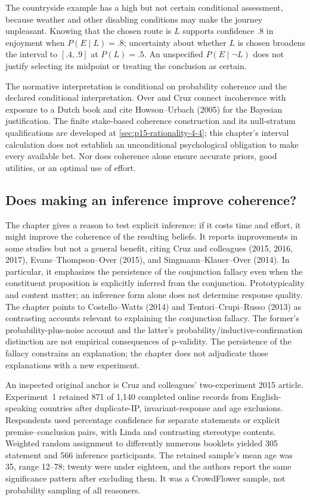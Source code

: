 The countryside example has a high but not certain conditional assessment,
because weather and other disabling conditions may make the journey
unpleasant. Knowing that the chosen route is \(L\) supports confidence
\(.8\) in enjoyment when \(P(E\mid L)=.8\); uncertainty about
whether \(L\) is chosen broadens the interval to \([.4,.9]\) at
\(P(L)=.5\). An unspecified \(P(E\mid\neg L)\) does not justify
selecting its midpoint or treating the conclusion as certain.

The normative interpretation is conditional on probability coherence and
the declared conditional interpretation. Over and Cruz connect incoherence
with exposure to a Dutch book and cite Howson--Urbach (2005) for the Bayesian
justification. The finite stake-based coherence construction and its
null-stratum qualifications are developed at \cref{sec:p15-rationality-4-4};
this chapter's interval calculation does not establish an unconditional
psychological obligation to make every available bet. Nor does coherence
alone ensure accurate priors, good utilities, or an optimal use of effort.

\subsection{Does making an inference improve coherence?}
\label{sec:p19-r62-explicit-inference}

The chapter gives a reason to test explicit inference: if it costs time and
effort, it might improve the coherence of the resulting beliefs. It reports
improvements in some studies but not a general benefit, citing Cruz and
colleagues (2015, 2016, 2017), Evans--Thompson--Over (2015), and
Singmann--Klauer--Over (2014). In particular, it emphasizes the persistence
of the conjunction fallacy even when the constituent proposition is
explicitly inferred from the conjunction. Prototypicality and content
matter; an inference form alone does not determine response quality.
The chapter points to Costello--Watts (2014) and Tentori--Crupi--Russo
(2013) as contrasting accounts relevant to explaining the conjunction
fallacy. The former's probability-plus-noise account and the latter's
probability/inductive-confirmation distinction are not empirical
consequences of p-validity. The persistence of the fallacy constrains
an explanation; the chapter does not adjudicate those explanations
with a new experiment.

An inspected original anchor is Cruz and colleagues' two-experiment
2015 article. Experiment~1 retained 871 of 1,140 completed online records
from English-speaking countries after duplicate-IP, invariant-response and
age exclusions. Respondents used percentage confidence for separate
statements or explicit premise--conclusion pairs, with Linda and contrasting
stereotype contents. Weighted random assignment to differently numerous
booklets yielded 305 statement and 566 inference participants. The retained
sample's mean age was 35, range 12--78; twenty were under eighteen, and
the authors report the same significance pattern after excluding them.
It was a CrowdFlower sample, not probability sampling of all reasoners.

